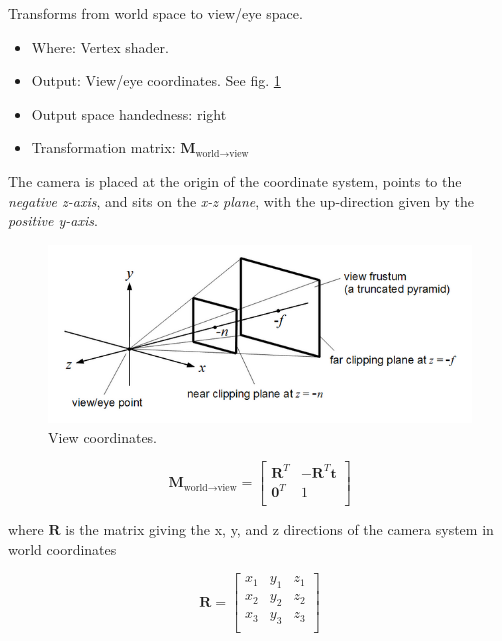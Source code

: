 \documentclass{scrartcl}
\begin{document}
        Transforms from world space to view/eye space.

        \begin{itemize}
            \item Where: Vertex shader.
            \item Output: View/eye coordinates. See fig. \ref{fig:view-coordinates}
            \item Output space handedness: right
            \item Transformation matrix: \(\mathbf{M}_{\text{world}\to\text{view}}\)
        \end{itemize}


        The camera is placed at the origin of the coordinate system, points to the \textit{negative z-axis}, and sits on the\textit{ x-z plane}, with the up-direction given by the \textit{positive y-axis}.


        \begin{figure}
            \centering
            \includegraphics[width=0.8\linewidth]{view-coordinates}
            \caption{View coordinates.}
            \label{fig:view-coordinates}
        \end{figure}


        \[
        \mathbf{M}_{\text{world}\to \text{view}} =
        \begin{bmatrix}
           \mathbf{R}^T & -\mathbf{R}^T \mathbf{t} \\
            \mathbf{0}^T &1 \\
        \end{bmatrix}
        \]

        where $\mathbf{R}$ is the matrix giving the x, y, and z directions of the camera system in world coordinates

        \[
        \mathbf{R} =
        \begin{bmatrix}
           x_1 & y_1 & z_1 \\
           x_2 & y_2 & z_2 \\
           x_3 & y_3 & z_3 \\
        \end{bmatrix}
        \]
\end{document}
